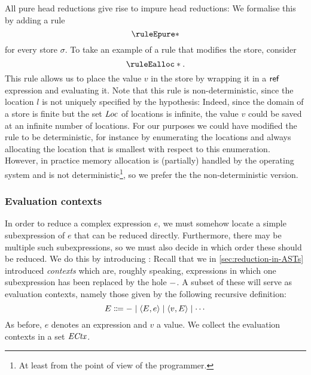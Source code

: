 All pure head reductions give rise to impure head reductions: We formalise this by adding a rule
%
\begin{equation*}
    \ruleEpure*
\end{equation*}
%
for every store $\sigma$. To take an example of a rule that modifies the store, consider
%
\begin{equation*}
    \ruleEalloc*.
\end{equation*}
%
This rule allows us to place the value $v$ in the store by wrapping it in a $\mathsf{ref}$ expression and evaluating it. Note that this rule is non-deterministic, since the location $l$ is not uniquely specified by the hypothesis: Indeed, since the domain of a store is finite but the set $\mathit{Loc}$ of locations is infinite, the value $v$ could be saved at an infinite number of locations. For our purposes we could have modified the rule  to be deterministic, for instance by enumerating the locations and always allocating the location that is smallest with respect to this enumeration. However, in practice memory allocation is (partially) handled by the operating system and is not deterministic\footnote{At least from the point of view of the programmer.}, so we prefer the the non-deterministic version.


\subsubsection{Evaluation contexts}\label{sec:evaluation-contexts}

In order to reduce a complex expression $e$, we must somehow locate a simple subexpression of $e$ that can be reduced directly. Furthermore, there may be multiple such subexpressions, so we must also decide in which order these should be reduced. We do this by introducing : Recall that we in \cref{sec:reduction-in-ASTs} introduced \emph{contexts} which are, roughly speaking, expressions in which one subexpression has been replaced by the hole ${-}$. A subset of these will serve as evaluation contexts, namely those given by the following recursive definition:
%
\begin{equation*}
    E \Coloneqq {-} \mid \langle\textcolor{black}{E},\textcolor{black}{e}\rangle \mid \langle\textcolor{black}{v},\textcolor{black}{E}\rangle \mid \cdots
\end{equation*}
%
As before, $e$ denotes an expression and $v$ a value. We collect the evaluation contexts in a set $\mathit{ECtx}$.

